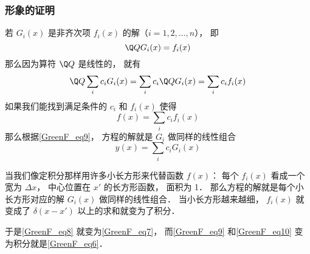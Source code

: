 \subsubsection{形象的证明}
若 $G_i(x)$ 是非齐次项 $f_i(x)$ 的解（$i = 1,2,\dots, n$）， 即
\begin{equation}\label{GreenF_eq8}
\Q Q G_i(x) = f_i(x)
\end{equation}
那么因为算符 $\Q Q$ 是线性的， 就有
\begin{equation}\label{GreenF_eq9}
\Q Q\sum_i c_i G_i(x) = \sum_i c_i \Q Q G_i(x) = \sum_i c_i f_i(x)
\end{equation}
如果我们能找到满足条件的 $c_i$ 和 $f_i(x)$ 使得
\begin{equation}\label{GreenF_eq10}
f(x) = \sum_i c_i f_i(x)
\end{equation}
那么根据\autoref{GreenF_eq9}， 方程的解就是 $G_i$ 做同样的线性组合
\begin{equation}
y(x) = \sum_i c_i G_i(x)
\end{equation}

当我们像定积分那样用许多小长方形来代替函数 $f(x)$： 每个 $f_i(x)$ 看成一个宽为 $\Delta x$， 中心位置在 $x'$ 的长方形函数， 面积为 1． 那么方程的解就是每个小长方形对应的解 $G_i(x)$ 做同样的线性组合． 当小长方形越来越细， $f_i(x)$ 就变成了 $\delta(x - x')$ 以上的求和就变为了积分．

于是\autoref{GreenF_eq8} 就变为\autoref{GreenF_eq7}， 而\autoref{GreenF_eq9} 和\autoref{GreenF_eq10} 变为积分就是\autoref{GreenF_eq6}． 
